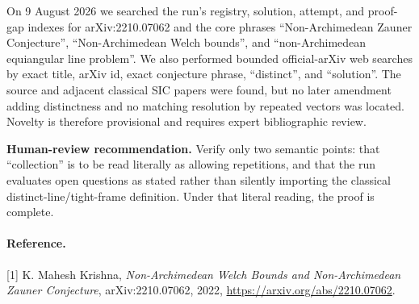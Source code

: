 \documentclass[11pt]{article}
\begin{document}
On 9 August 2026 we searched the run's registry, solution, attempt, and
proof-gap indexes for arXiv:2210.07062 and the core phrases
``Non-Archimedean Zauner Conjecture'', ``Non-Archimedean Welch bounds'', and
``non-Archimedean equiangular line problem''.  We also performed bounded
official-arXiv web searches by exact title, arXiv id, exact conjecture phrase,
``distinct'', and ``solution''.  The source and adjacent classical SIC papers
were found, but no later amendment adding distinctness and no matching
resolution by repeated vectors was located.  Novelty is therefore
provisional and requires expert bibliographic review.

\textbf{Human-review recommendation.}  Verify only two semantic points: that
``collection'' is to be read literally as allowing repetitions, and that the
run evaluates open questions as stated rather than silently importing the
classical distinct-line/tight-frame definition.  Under that literal reading,
the proof is complete.

\enlargethispage{\baselineskip}
\paragraph{Reference.}
[1] K. Mahesh Krishna,
\emph{Non-Archimedean Welch Bounds and Non-Archimedean Zauner Conjecture},
arXiv:2210.07062, 2022,
\url{https://arxiv.org/abs/2210.07062}.
\end{document}
